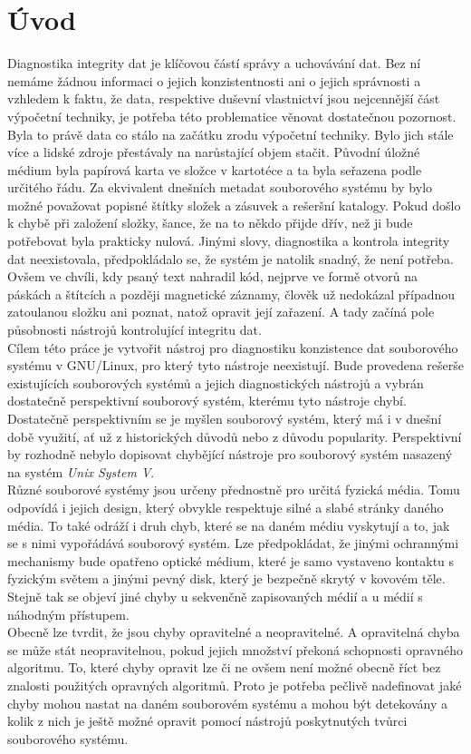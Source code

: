 \chapter*{Úvod}
{}

Diagnostika integrity dat je klíčovou částí správy a uchovávání dat. Bez ní nemáme žádnou informaci o jejich konzistentnosti ani o jejich správnosti a vzhledem k faktu, že data, respektive duševní vlastnictví jsou nejcennější část výpočetní techniky, je potřeba této problematice věnovat dostatečnou pozornost.\\
Byla to právě data co stálo na začátku zrodu výpočetní techniky. Bylo jich stále více a lidské zdroje přestávaly na narůstající objem stačit. Původní úložné médium byla papírová karta ve složce v kartotéce a ta byla seřazena podle určitého řádu. Za ekvivalent dnešních metadat souborového systému by bylo možné považovat popisné štítky složek a zásuvek a rešeršní katalogy. Pokud došlo k chybě při založení složky, šance, že na to někdo přijde dřív, než ji bude potřebovat byla prakticky nulová. Jinými slovy, diagnostika a kontrola integrity dat neexistovala, předpokládalo se, že systém je natolik snadný, že není potřeba. Ovšem ve chvíli, kdy psaný text nahradil kód, nejprve ve formě otvorů na páskách a štítcích a později magnetické záznamy, člověk už nedokázal případnou zatoulanou složku ani poznat, natož opravit její zařazení. A tady začíná pole působnosti nástrojů kontrolující integritu dat.\\ 
Cílem této práce je vytvořit nástroj pro diagnostiku konzistence dat souborového systému v GNU/Linux, pro který tyto nástroje neexistují. Bude provedena rešerše existujících souborových systémů a jejich diagnostických nástrojů a vybrán dostatečně perspektivní souborový systém, kterému tyto nástroje chybí. Dostatečně perspektivním se je myšlen souborový systém, který má i v dnešní době využití, ať už z historických důvodů nebo z důvodu popularity. Perspektivní by rozhodně nebylo dopisovat chybějící nástroje pro souborový systém nasazený na systém \emph{Unix System V}.\\
Různé souborové systémy jsou určeny přednostně pro určitá fyzická média. Tomu odpovídá i jejich design, který obvykle respektuje silné a slabé stránky daného média. To také odráží i druh chyb, které se na daném médiu vyskytují a to, jak se s nimi vypořádává souborový systém. Lze předpokládat, že jinými ochrannými mechanismy bude opatřeno optické médium, které je samo vystaveno kontaktu s fyzickým světem a jinými pevný disk, který je bezpečně skrytý v kovovém těle. Stejně tak se objeví jiné chyby u sekvenčně zapisovaných médií a u médií s náhodným přístupem.\\
Obecně lze tvrdit, že jsou chyby opravitelné a neopravitelné. A opravitelná chyba se může stát neopravitelnou, pokud jejich množství překoná schopnosti opravného algoritmu. To, které chyby opravit lze či ne ovšem není možné obecně říct bez znalosti použitých opravných algoritmů. Proto je potřeba pečlivě nadefinovat jaké chyby mohou nastat na daném souborovém systému a mohou být detekovány a kolik z nich je ještě možné opravit pomocí nástrojů poskytnutých tvůrci souborového systému. 
